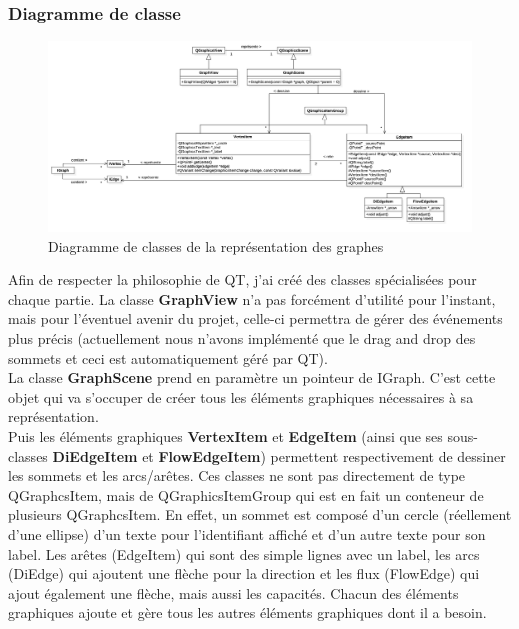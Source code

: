 \documentclass[french]{article}
\begin{document}
	\subsubsection{Diagramme de classe}
	\begin{figure}[H]
		\centering
		\includegraphics[width=0.9\textheight,angle=90]{Conception/visualization/visualization.png}
		\caption{Diagramme de classes de la représentation des graphes}
	\end{figure}
	
	\pagebreak
	
	Afin de respecter la philosophie de QT, j'ai créé des classes spécialisées pour chaque partie. La classe \textbf{GraphView} n'a pas forcément d'utilité pour l'instant, mais pour l'éventuel avenir du projet, celle-ci permettra de gérer des événements plus précis (actuellement nous n'avons implémenté que le drag and drop des sommets et ceci est automatiquement géré par QT). \\
	La classe \textbf{GraphScene} prend en paramètre un pointeur de IGraph. C'est cette objet qui va s'occuper de créer tous les éléments graphiques nécessaires à sa représentation. \\
	Puis les éléments graphiques \textbf{VertexItem} et \textbf{EdgeItem} (ainsi que ses sous-classes \textbf{DiEdgeItem} et \textbf{FlowEdgeItem}) permettent respectivement de dessiner les sommets et les arcs/arêtes. Ces classes ne sont pas directement de type QGraphcsItem, mais de QGraphicsItemGroup qui est en fait un conteneur de plusieurs QGraphcsItem. En effet, un sommet est composé d'un cercle (réellement d'une ellipse) d'un texte pour l'identifiant affiché et d'un autre texte pour son label. Les arêtes (EdgeItem) qui sont des simple lignes avec un label, les arcs (DiEdge) qui ajoutent une flèche pour la direction et les flux (FlowEdge) qui ajout également une flèche, mais aussi les capacités. Chacun des éléments graphiques ajoute et gère tous les autres éléments graphiques dont il a besoin. \\
	
\end{document}
